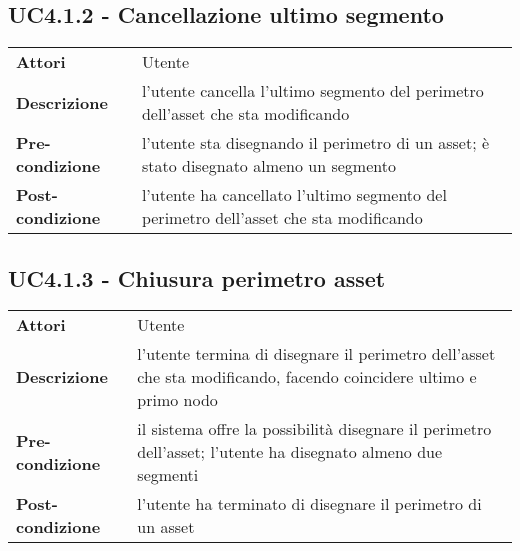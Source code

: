 \subsection{UC4.1.2 - Cancellazione ultimo segmento}
\label{sssec:UC4.1.2}
\def\arraystretch{1.5}
\begin{tabularx}{\textwidth}{l|p{}}
\rowcolor{I} \multicolumn{2}{c}{\color{white}\textbf{UC4.1.2 - Cancellazione ultimo segmento}} \\
\toprule
\endhead
\textbf{Attori} & Utente\\
\textbf{Descrizione} & l'utente cancella l'ultimo segmento del perimetro dell'asset che sta modificando\\
\textbf{Pre-condizione} & l'utente sta disegnando il perimetro di un asset; è stato disegnato almeno un segmento\\
\textbf{Post-condizione} & l'utente ha cancellato l'ultimo segmento del perimetro dell'asset che sta modificando\\
\bottomrule
\end{tabularx}
\subsection{UC4.1.3 - Chiusura perimetro asset}
\label{sssec:UC4.1.3}
\def\arraystretch{1.5}
\begin{tabularx}{\textwidth}{l|p{}}
\rowcolor{I} \multicolumn{2}{c}{\color{white}\textbf{UC4.1.3 - Chiusura perimetro asset}} \\
\toprule
\endhead
\textbf{Attori} & Utente\\
\textbf{Descrizione} & l'utente termina di disegnare il perimetro dell'asset che sta modificando, facendo coincidere ultimo e primo nodo\\
\textbf{Pre-condizione} & il sistema offre la possibilità  disegnare il perimetro dell'asset; l'utente ha disegnato almeno due segmenti\\
\textbf{Post-condizione} & l'utente ha terminato di disegnare il perimetro di un asset\\
\bottomrule
\end{tabularx}
